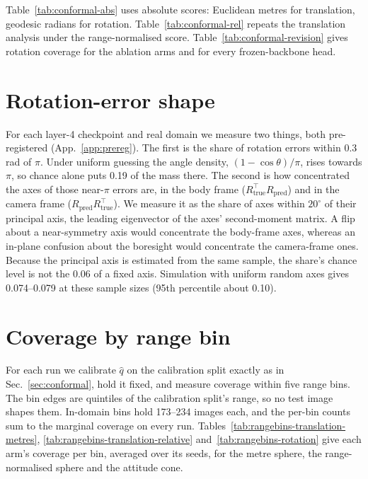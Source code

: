 Table~\ref{tab:conformal-abs} uses absolute scores: Euclidean metres for translation, geodesic
radians for rotation. Table~\ref{tab:conformal-rel} repeats the translation analysis under the
range-normalised score. Table~\ref{tab:conformal-revision} gives rotation coverage for the
ablation arms and for every frozen-backbone head.





\clearpage




\section{Rotation-error shape}
\label{app:rotshape}

For each layer-4 checkpoint and real domain we measure two things, both pre-registered
(App.~\ref{app:prereg}). The first is the share of rotation errors within 0.3\,rad of $\pi$.
Under uniform guessing the angle density, $(1-\cos\theta)/\pi$, rises towards $\pi$, so chance
alone puts 0.19 of the mass there. The second is how concentrated the axes of those near-$\pi$
errors are, in the body frame ($R_\mathrm{true}^{\top} R_\mathrm{pred}$) and in the camera
frame ($R_\mathrm{pred} R_\mathrm{true}^{\top}$). We measure it as the share of axes within
$20^{\circ}$ of their principal axis, the leading eigenvector of the axes' second-moment
matrix. A flip about a near-symmetry axis would concentrate the body-frame axes, whereas an
in-plane confusion about the boresight would concentrate the camera-frame ones. Because the principal
axis is estimated from the same sample, the share's chance level is not the 0.06 of a fixed
axis. Simulation with uniform random axes gives 0.074--0.079 at these sample sizes (95th
percentile about 0.10).



\clearpage
\section{Coverage by range bin}
\label{app:range}

For each run we calibrate $\hat{q}$ on the calibration split exactly as in
Sec.~\ref{sec:conformal}, hold it fixed, and measure coverage within five range bins. The bin
edges are quintiles of the calibration split's range, so no test image shapes them. In-domain
bins hold 173--234 images each, and the per-bin counts sum to the marginal coverage on every
run. Tables~\ref{tab:rangebins-translation-metres}, \ref{tab:rangebins-translation-relative}
and~\ref{tab:rangebins-rotation} give each arm's coverage per bin, averaged over its seeds, for
the metre sphere, the range-normalised sphere and the attitude cone.

